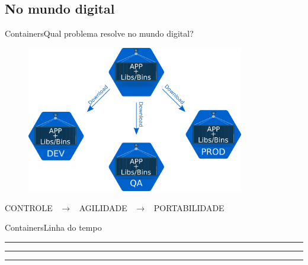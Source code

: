 \subsection{No mundo digital}
\begin{frame}{Containers}{Qual problema resolve no mundo digital?}
 \begin{figure}[ht!]
    \centering
    \includegraphics[width=95mm]{images/container_application.png}
  \end{figure}
  \begin{center}
    CONTROLE ~$\to$~ AGILIDADE ~$\to$~ PORTABILIDADE
  \end{center}
\end{frame}

\begin{frame}{Containers}{Linha do tempo}
  \begin{table}
    \centering
    \begin{minipage}[t]{.9\linewidth}
      \color{gray}
      \rule{\linewidth}{1pt}
      \rule{\linewidth}{0.3pt}
      \bigskip
      \rule{\linewidth}{1pt}
    \end{minipage}
  \end{table}
\end{frame}
